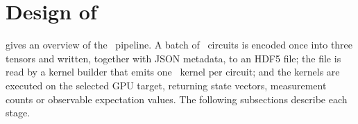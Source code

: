 \section{Design of \qgear}\label{sec:qgear:design}

 gives an overview of the \qgear\ pipeline. A batch of \qiskit\ circuits is encoded once into three tensors and written, together with JSON metadata, to an HDF5 file; the file is read by a kernel builder that emits one \cudaq\ kernel per circuit; and the kernels are executed on the selected GPU target, returning state vectors, measurement counts or observable expectation values. The following subsections describe each stage.

